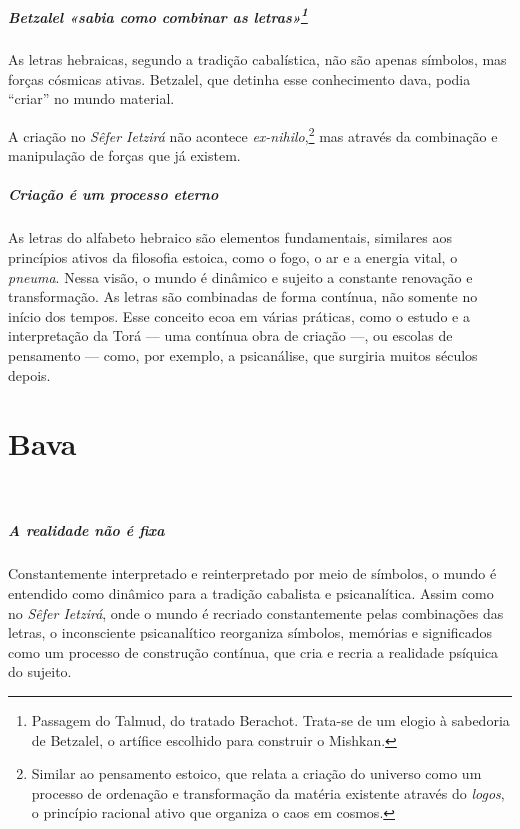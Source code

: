 \paragraph{Betzalel «sabia como combinar as letras»\footnote{Passagem do Talmud, do tratado Berachot. Trata-se de um elogio à sabedoria de Betzalel, o artífice escolhido para construir o Mishkan.}} As letras hebraicas, segundo a tradição cabalística, não são apenas símbolos, mas forças cósmicas ativas. Betzalel, que detinha esse conhecimento dava, podia ``criar'' no mundo material.

A criação no \textit{Sêfer Ietzirá} não acontece \textit{ex-nihilo},\footnote{Similar ao pensamento estoico, que relata a criação do universo como um processo de ordenação e transformação da matéria existente através do \textit{logos}, o princípio racional ativo que organiza o caos em cosmos.} mas através da combinação e manipulação de forças que já existem.

\paragraph{Criação é um processo eterno} As letras do alfabeto hebraico são elementos fundamentais, similares aos princípios ativos da filosofia estoica, como o fogo, o ar e a energia vital, o \textit{pneuma}. Nessa visão, o mundo é dinâmico e sujeito a constante renovação e transformação. As letras são combinadas de forma contínua, não somente no início dos tempos. Esse conceito ecoa em várias práticas, como o estudo e a interpretação da Torá --- uma contínua obra de criação ---, ou escolas de pensamento --- como, por exemplo, a psicanálise, que surgiria muitos séculos depois.

\chapter*{Bava 
\smallskip{}}

\begin{center}
{\huge{}}\\\medskip{\footnotesize\formularlight{
\lipsum[2]
}}
\end{center}

\paragraph{A realidade não é fixa} Constantemente interpretado e reinterpretado por meio de símbolos, o mundo é entendido como dinâmico para a tradição cabalista e psicanalítica. Assim como no \textit{Sêfer Ietzirá}, onde o mundo é recriado constantemente pelas combinações das letras, o inconsciente psicanalítico reorganiza símbolos, memórias e significados como um processo de construção contínua, que cria e recria a realidade psíquica do sujeito. 

